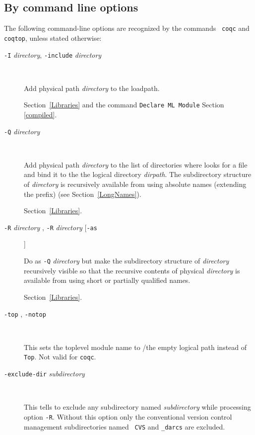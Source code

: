 \subsection{By command line options
\label{vmoption}
\label{coqoptions}}

The following command-line options are recognized by the commands {\tt
  coqc} and {\tt coqtop}, unless stated otherwise:

\begin{description}
\item[{\tt -I} {\em directory}, {\tt -include} {\em directory}]\

Add physical path {\em directory} to the {\ocaml} loadpath.

  \SeeAlso Section~\ref{Libraries} and the command {\tt Declare ML Module} Section \ref{compiled}.

\item[\texttt{-Q} \emph{directory} {\dirpath}]\

  Add physical path \emph{directory} to the list of directories where
  {\Coq} looks for a file and bind it to the the logical directory
  \emph{dirpath}. The subdirectory structure of \emph{directory} is
  recursively available from {\Coq} using absolute names (extending
  the {\dirpath} prefix) (see Section~\ref{LongNames}).

  \SeeAlso Section~\ref{Libraries}.

\item[{\tt -R} {\em directory} {\dirpath}, {\tt -R} {\em directory} [{\tt -as} {\dirpath}]]\

  Do as \texttt{-Q} \emph{directory} {\dirpath} but make the
  subdirectory structure of \emph{directory} recursively visible so
  that the recursive contents of physical \emph{directory} is available
  from {\Coq} using short or partially qualified names.
  
  \SeeAlso Section~\ref{Libraries}.

\item[{\tt -top} {\dirpath}, {\tt -notop}]\ 

  This sets the toplevel module name to {\dirpath}/the empty logical path instead
  of {\tt Top}. Not valid for {\tt coqc}.

\item[{\tt -exclude-dir} {\em subdirectory}]\ 

  This tells to exclude any subdirectory named {\em subdirectory}
  while processing option {\tt -R}. Without this option only the
  conventional version control management subdirectories named {\tt
  CVS} and {\tt \_darcs} are excluded.


\end{description}
